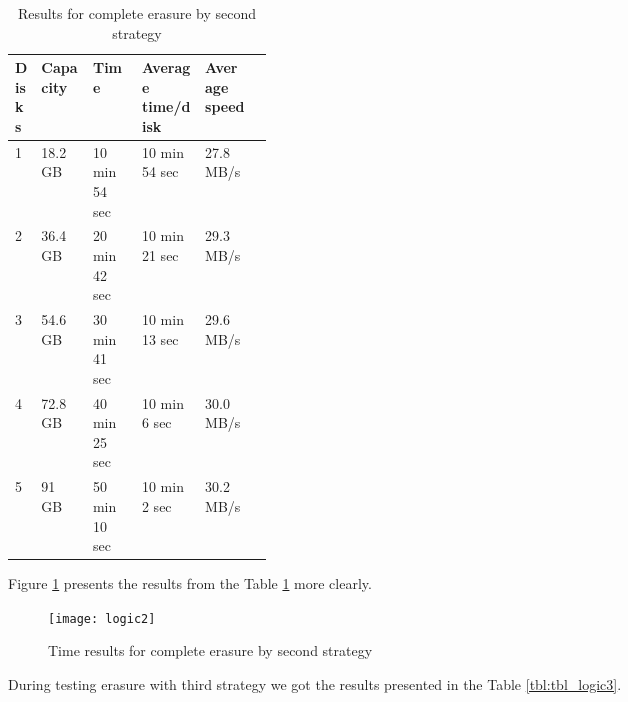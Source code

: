 \begin{table}[h!]
  \caption{Results for complete erasure by second strategy}
  \begin{center}
  \begin{tabularx}{\textwidth}{|p{0.1\linewidth}|p{0.2\linewidth}|X|X|X|X|}
    \hline
    Disks & Capacity & Time & Average time/disk & Average speed
    \\ \hline
    1 & 18.2 GB & 10 min 54 sec & 10 min 54 sec & 27.8 MB/s \\ \hline    
    2 & 36.4 GB & 20 min 42 sec & 10 min 21 sec & 29.3 MB/s \\ \hline
    3 & 54.6 GB & 30 min 41 sec & 10 min 13 sec & 29.6 MB/s \\ \hline
    4 & 72.8 GB & 40 min 25 sec & 10 min 6 sec  & 30.0 MB/s \\ \hline
    5 & 91 GB   & 50 min 10 sec & 10 min 2 sec  & 30.2 MB/s \\ \hline
  \end{tabularx}
  \label{tbl:tbl_logic2}
  \end{center}
\end{table}
Figure \ref{fig:logic2} presents the results from the Table \ref{tbl:tbl_logic2} more clearly.
\begin{figure}[h!]
\begin{center}
  \texttt{[image: logic2]}
\end{center}
  \caption{Time results for complete erasure by second strategy}
  \label{fig:logic2}
\end{figure}


\newpage
During testing erasure with third strategy we got the results presented in the Table \ref{tbl:tbl_logic3}. 


